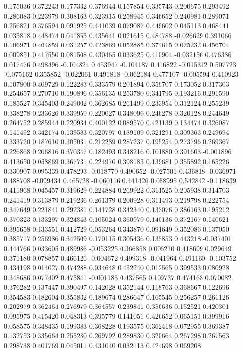 0.175036
0.372243
0.177332
0.376944
0.157854
0.335743
0.200675
0.293492
0.286083
0.223979
0.308163
0.323915
0.258945
0.346652
0.240981
0.289071
0.256821
0.376594
0.091925
0.441039
0.079087
0.449602
0.045113
0.468441
0.035818
0.448474
0.041855
0.435641
0.021615
0.484788
-0.026629
0.391066
0.106971
0.464859
0.031257
0.423869
0.052885
0.374615
0.025232
0.456704
0.009851
0.417550
0.081508
0.430465
0.033625
0.410904
-0.032156
0.476386
0.017476
0.498496
-0.104824
0.453947
-0.104187
0.416822
-0.015312
0.507723
-0.075162
0.355852
-0.022061
0.491818
-0.062184
0.477107
-0.005594
0.410923
0.107800
0.409729
0.122283
0.333579
0.201894
0.359707
0.173052
0.317303
0.254657
0.270710
0.190896
0.356135
0.253780
0.341795
0.193216
0.291590
0.185527
0.345403
0.249002
0.362685
0.261499
0.233954
0.312124
0.255239
0.338278
0.233626
0.339959
0.220027
0.348096
0.246278
0.320128
0.244649
0.264752
0.285944
0.220934
0.400122
0.089570
0.421139
0.134474
0.326087
0.141492
0.342174
0.139583
0.320797
0.189109
0.321291
0.309363
0.249694
0.333720
0.187610
0.305031
0.212289
0.287237
0.195254
0.273796
0.269367
0.226868
0.206816
0.370347
0.182493
0.348216
0.101880
0.391603
-0.001896
0.413650
0.058869
0.367731
0.224970
0.398183
0.139681
0.355892
0.165226
0.330907
0.095339
0.478293
-0.018770
0.490652
-0.027501
0.436818
-0.036971
0.488708
-0.099434
0.465728
-0.060116
0.441426
0.058995
0.542842
-0.118639
0.411968
0.045457
0.319629
0.224884
0.269922
0.311525
0.205938
0.314703
0.241419
0.313879
0.219236
0.261379
0.200928
0.311493
0.219798
0.222754
0.347649
0.221841
0.292381
0.141728
0.342340
0.133076
0.386163
0.195212
0.370323
0.133297
0.324843
0.105024
0.360979
0.140136
0.372167
0.140621
0.395658
0.133551
0.412729
0.053264
0.343870
0.091649
0.352086
0.137050
0.385717
0.256986
0.342509
0.170115
0.305436
0.133853
0.443218
-0.037401
0.444766
0.033605
0.489986
-0.053225
0.366858
0.006210
0.418699
0.029649
0.371180
0.078857
0.466126
-0.004672
0.499318
-0.041964
0.491160
-0.103752
0.434198
0.014027
0.474288
0.034648
0.452240
0.012565
0.399533
0.080928
0.348686
0.077402
0.475841
-0.001183
0.437565
0.109737
0.474168
0.070082
0.376282
0.137447
0.390497
0.142028
0.352144
0.118763
0.368667
0.122696
0.354583
0.182604
0.355832
0.189674
0.286647
0.165545
0.256257
0.261126
0.202979
0.362464
0.276979
0.364557
0.239841
0.356636
0.152521
0.420301
0.095975
0.415420
0.048313
0.395779
0.141051
0.426652
0.065151
0.399916
0.058575
0.348435
0.199383
0.368228
0.193575
0.362418
0.072955
0.369387
0.132753
0.335664
0.255280
0.269792
0.289830
0.320664
0.267298
0.267563
0.298738
0.401769
0.045011
0.431040
0.032113
0.424698
0.069208
